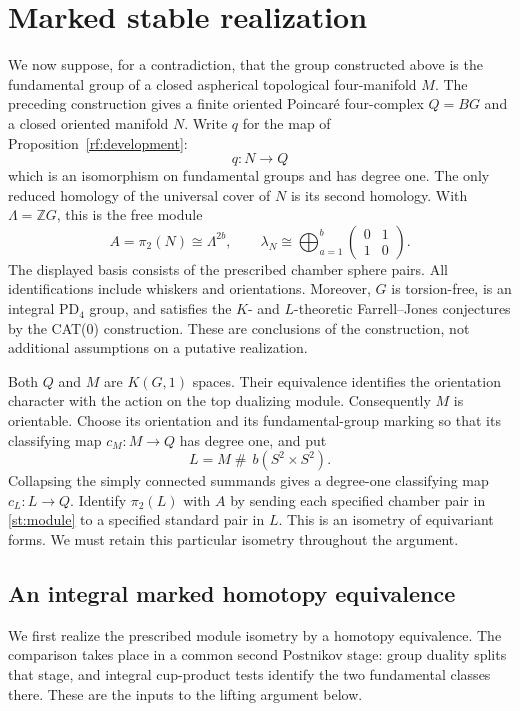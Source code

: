 \documentclass[11pt]{article}
\theoremstyle{definition}
\theoremstyle{remark}
\newcommand{\Z}{\mathbb Z}
\begin{document}
\section{Marked stable realization}\label{st:setup}

We now suppose, for a contradiction, that the group constructed above is
the fundamental group of a closed aspherical topological four-manifold
$M$.  The preceding construction gives a finite oriented Poincar\'e
four-complex $Q=BG$ and a closed oriented manifold $N$.  Write $q$ for
the map of Proposition~\ref{rf:development}:
\[
 q\colon N\longrightarrow Q
\]
which is an isomorphism on fundamental groups and has degree one.  The
only reduced homology of the universal cover of $N$ is its second
homology.  With $\Lambda=\Z G$, this is the free module
\begin{equation}\label{st:module}
 A=\pi_2(N)\cong\Lambda^{2b},
 \qquad \lambda_N\cong\bigoplus_{a=1}^{b}
 \begin{pmatrix}0&1\\1&0\end{pmatrix}.
\end{equation}
The displayed basis consists of the prescribed chamber sphere pairs.
All identifications include whiskers and orientations.  Moreover, $G$
is torsion-free, is an integral $\mathrm{PD}_4$ group, and satisfies the
$K$- and $L$-theoretic Farrell--Jones conjectures by the CAT(0)
construction.  These are conclusions of the construction, not
additional assumptions on a putative realization.

Both $Q$ and $M$ are $K(G,1)$ spaces.  Their equivalence identifies the
orientation character with the action on the top dualizing module.
Consequently $M$ is orientable.  Choose its orientation and its
fundamental-group marking so that its classifying map
$c_M\colon M\to Q$ has degree one, and put
\[
 L=M\mathbin{\#}\,b(S^2\times S^2).
\]
Collapsing the simply connected summands gives a degree-one classifying
map $c_L\colon L\to Q$.  Identify $\pi_2(L)$ with $A$ by sending each
specified chamber pair in \eqref{st:module} to a specified standard pair
in $L$.  This is an isometry of equivariant forms.  We must retain this
particular isometry throughout the argument.

\subsection{An integral marked homotopy equivalence}

We first realize the prescribed module isometry by a homotopy
equivalence. The comparison takes place in a common second Postnikov
stage: group duality splits that stage, and integral cup-product tests
identify the two fundamental classes there. These are the inputs to
the lifting argument below.
\end{document}

